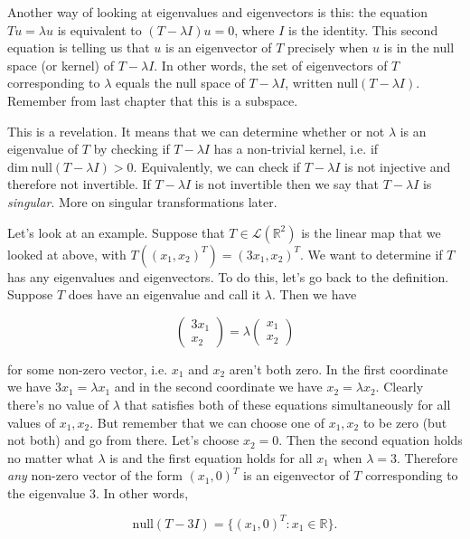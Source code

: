 \documentclass[12pt]{article}
\begin{document}
\vskip 3mm
Another way of looking at eigenvalues and eigenvectors is this:  the equation $Tu = \lambda u$ is equivalent to $(T - \lambda I)u = 0$, where $I$ is the identity. This second equation is telling us that $u$ is an eigenvector of $T$ precisely when $u$ is in the null space (or kernel) of $T - \lambda I$. In other words, the set of eigenvectors of $T$ corresponding to $\lambda$ equals the null space of $T - \lambda I$, written $\textrm{null} (T - \lambda I)$. Remember from last chapter that this is a subspace.

This is a revelation. It means that we can determine whether or not $\lambda$ is an eigenvalue of $T$ by checking if $T - \lambda I$ has a non-trivial kernel, i.e. if $\textrm{dim} \:  \textrm{null} (T - \lambda I) > 0$. Equivalently, we can check if $T - \lambda I$ is not injective and therefore not invertible. If $T - \lambda I$ is not invertible then we say that $T - \lambda I$ is \textit{singular}. More on singular transformations later.


Let's look at an example. Suppose that $T \in \mathcal{L} (\mathbb{R}^2)$ is the linear map that we looked at above, with $T((x_1, x_2)^T) = (3x_1, x_2)^T$. We want to determine if $T$ has any eigenvalues and eigenvectors. To do this, let's go back to the definition. Suppose $T$ does have an eigenvalue and call it $\lambda$. Then we have

\[ 
\begin{pmatrix}
3x_1 \\
x_2
\end{pmatrix}
=
\lambda \begin{pmatrix}
x_1 \\
x_2
\end{pmatrix}
\]

for some non-zero vector, i.e. $x_1$ and $x_2$ aren't both zero. In the first coordinate we have $3x_1 = \lambda x_1$ and in the second coordinate we have $x_2 = \lambda x_2$. Clearly there's no value of $\lambda$ that satisfies both of these equations simultaneously for all values of $x_1, x_2$. But remember that we can choose one of $x_1, x_2$ to be zero (but not both) and go from there. Let's choose $x_2 = 0$. Then the second equation holds no matter what $\lambda$ is and the first equation holds for all $x_1$ when $\lambda = 3$. Therefore \textit{any} non-zero vector of the form $(x_1, 0)^T$ is an eigenvector of $T$ corresponding to the eigenvalue 3. In other words,

$$\textrm{null} (T - 3I) = \{ (x_1, 0)^T : x_1 \in \mathbb{R} \}.$$
\end{document}
